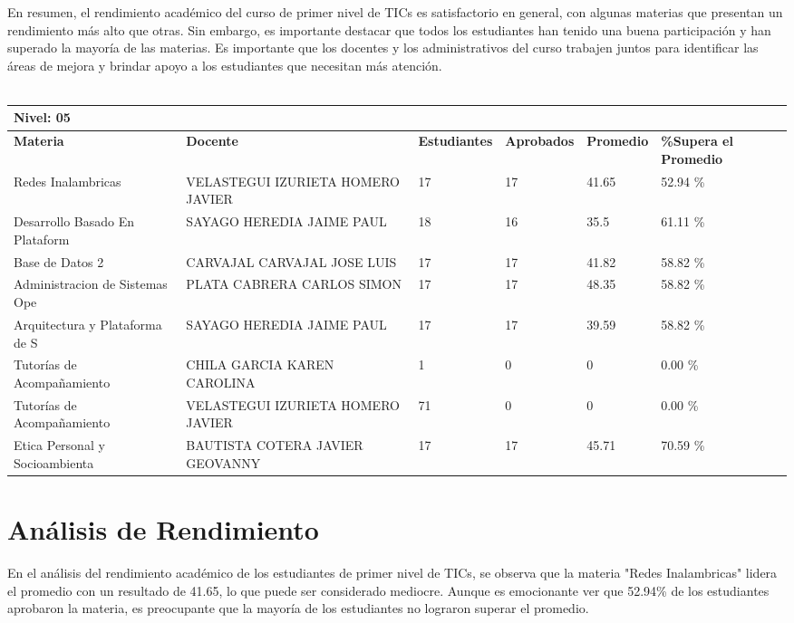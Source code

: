 En resumen, el rendimiento académico del curso de primer nivel de TICs es satisfactorio en general, con algunas materias que presentan un rendimiento más alto que otras. Sin embargo, es importante destacar que todos los estudiantes han tenido una buena participación y han superado la mayoría de las materias. Es importante que los docentes y los administrativos del curso trabajen juntos para identificar las áreas de mejora y brindar apoyo a los estudiantes que necesitan más atención.\\
\vspace{1cm}\\\small
\begin{tabularx}{\textwidth}{|p{2.5cm}|p{2.5cm}|X|X|X|X|}
\hline
\multicolumn{6}{|X|}{\textbf{Nivel: 05 }}\\\hline\textbf{Materia} & \textbf{Docente} & \textbf{Estudiantes} & \textbf{Aprobados} & \textbf{Promedio} & \textbf{\%Supera el Promedio} \\ \hline
Redes Inalambricas & VELASTEGUI IZURIETA HOMERO JAVIER & 17 & 17 & 41.65 & 52.94 \%\\ \hline
Desarrollo Basado En Plataform & SAYAGO HEREDIA JAIME PAUL & 18 & 16 & 35.5 & 61.11 \%\\ \hline
Base de Datos 2 & CARVAJAL CARVAJAL JOSE LUIS & 17 & 17 & 41.82 & 58.82 \%\\ \hline
Administracion de Sistemas Ope & PLATA CABRERA CARLOS SIMON & 17 & 17 & 48.35 & 58.82 \%\\ \hline
Arquitectura y Plataforma de S & SAYAGO HEREDIA JAIME PAUL & 17 & 17 & 39.59 & 58.82 \%\\ \hline
Tutorías de Acompañamiento & CHILA GARCIA KAREN CAROLINA & 1 & 0 & 0 & 0.00 \%\\ \hline
Tutorías de Acompañamiento & VELASTEGUI IZURIETA HOMERO JAVIER & 71 & 0 & 0 & 0.00 \%\\ \hline
Etica Personal y Socioambienta & BAUTISTA COTERA JAVIER GEOVANNY & 17 & 17 & 45.71 & 70.59 \%\\ \hline
\end{tabularx}

\vspace{1cm}
\section{Análisis de Rendimiento}
En el análisis del rendimiento académico de los estudiantes de primer nivel de TICs, se observa que la materia "Redes Inalambricas" lidera el promedio con un resultado de 41.65, lo que puede ser considerado mediocre. Aunque es emocionante ver que 52.94\% de los estudiantes aprobaron la materia, es preocupante que la mayoría de los estudiantes no lograron superar el promedio.

